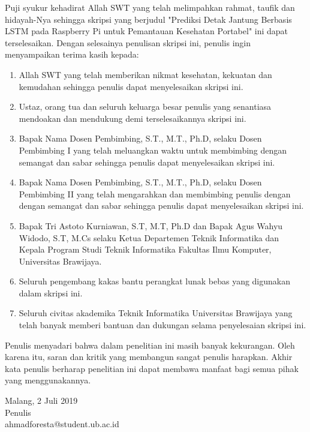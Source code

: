 \documentclass{skripsi}
\begin{document}
{\preface

  Puji syukur kehadirat Allah SWT yang telah melimpahkan rahmat,
  taufik dan hidayah-Nya sehingga skripsi yang berjudul 
  "Prediksi Detak Jantung Berbasis LSTM pada Raspberry Pi untuk
  Pemantauan Kesehatan Portabel" ini dapat terselesaikan. Dengan
  selesainya penulisan skripsi ini, penulis ingin menyampaikan terima kasih
  kepada:

  \begin{singlespace}
    \begin{enumerate}
  \item{Allah SWT yang telah memberikan nikmat kesehatan, kekuatan dan
      kemudahan sehingga penulis dapat menyelesaikan skripsi ini.}
  \item{Ustaz, orang tua dan seluruh keluarga besar penulis yang
      senantiasa mendoakan dan mendukung demi terselesaikannya skripsi
      ini.}
  \item{Bapak Nama Dosen Pembimbing, S.T., M.T., Ph.D, selaku Dosen Pembimbing I
      yang telah meluangkan waktu untuk membimbing dengan semangat dan
      sabar sehingga penulis dapat menyelesaikan skripsi ini.}
  \item{Bapak Nama Dosen Pembimbing, S.T., M.T., Ph.D, selaku
      Dosen Pembimbing II yang telah mengarahkan dan membimbing
      penulis dengan dengan semangat dan sabar sehingga penulis dapat
      menyelesaikan skripsi ini.}
  \item {Bapak Tri Astoto Kurniawan, S.T, M.T, Ph.D dan Bapak Agus
      Wahyu Widodo, S.T, M.Cs selaku Ketua Departemen Teknik Informatika
      dan Kepala Program Studi Teknik Informatika Fakultas Ilmu
      Komputer, Universitas Brawijaya.}
  \item{Seluruh pengembang kakas bantu perangkat lunak bebas yang
      digunakan dalam skripsi ini.}
  \item{Seluruh civitas akademika Teknik Informatika Universitas
      Brawijaya yang telah banyak memberi bantuan dan dukungan selama
      penyelesaian skripsi ini.}
  \end{enumerate}
  \end{singlespace}

  Penulis menyadari bahwa dalam penelitian ini masih banyak
  kekurangan. Oleh karena itu, saran dan kritik yang membangun sangat
  penulis harapkan. Akhir kata penulis berharap penelitian ini dapat
  membawa manfaat bagi semua pihak yang menggunakannya.

  \vspace{0.8cm}

  \noindent
  \hspace*{8cm}Malang, 2 Juli 2019  
  \vspace{1.5cm} \\
  \hspace*{8cm}Penulis \\
  \hspace*{8cm}ahmadforesta@student.ub.ac.id
}
\end{document}

